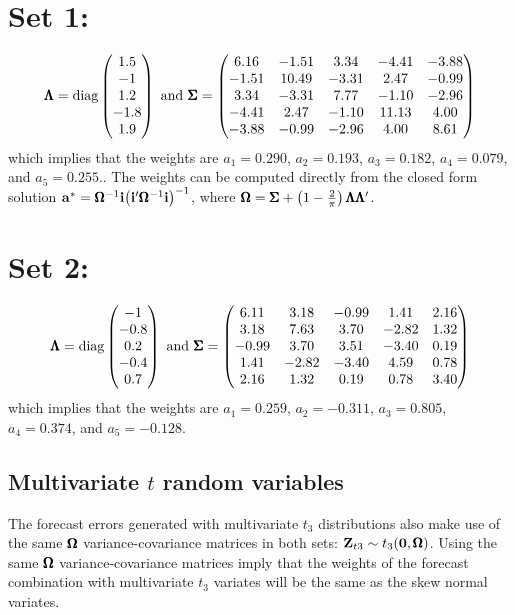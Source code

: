 \documentclass[a4paper, 11pt]{article}
\begin{document}
\section*{Set 1:} 
\[
\pmb{\Lambda}= \text{diag} \begin{pmatrix}
1.5 \\ 
-1\\ 
1.2\\ 
-1.8\\ 
1.9 
\end{pmatrix} 
\textrm{ and }  \pmb{\Sigma}=  
\begin{pmatrix}
6.16&	-1.51	& 3.34&	-4.41	&-3.88\\
-1.51&	10.49&	-3.31&	2.47&	-0.99\\
3.34&	-3.31	&7.77&	-1.10	&-2.96\\
-4.41&	2.47&	-1.10&	11.13&	4.00\\
-3.88	&-0.99&	-2.96	&4.00&	8.61
\end{pmatrix} 
\]
which implies that the weights are $a_1 = 0.290$, $a_2 = 0.193$, $a_3 = 0.182$, $a_4 = 0.079$, and $a_5 = 0.255$.. The weights can be computed directly from the closed form solution $\mathbf{a}^* = \pmb{\Omega}^{-1} \mathbf{i} {\left ( \mathbf{i}'\pmb{\Omega}^{-1}\mathbf{i} \right )}^{-1}$, where $ \pmb{\Omega} = \pmb{\Sigma} + \left ( 1 - \frac{2}{\pi} \right ) \pmb{\Lambda} \pmb{\Lambda}'$.

\section*{Set 2:} 
\[
\pmb{\Lambda}= \text{diag} \begin{pmatrix}
-1\\
-0.8\\
0.2\\
-0.4\\
0.7
\end{pmatrix} 
\textrm{ and }  \pmb{\Sigma}=  
\begin{pmatrix}
6.11&	3.18&	-0.99	&1.41&	2.16\\
3.18&	7.63&	3.70&	-2.82&	1.32\\
-0.99	&3.70&	3.51&	-3.40	&0.19\\
1.41&	-2.82&	-3.40	&4.59&	0.78\\
2.16&	1.32&	0.19&	0.78&	3.40
\end{pmatrix} 
\]
which implies that the weights are $a_1 = 0.259$, $a_2 = -0.311$, $a_3 = 0.805$, $a_4 = 0.374$, and $a_5 = -0.128$.

\subsection{Multivariate $t$ random variables}
The forecast errors generated with multivariate $t_3$ distributions also make use of the same $\pmb{\Omega}$ variance-covariance matrices in both sets: $\mathbf{Z}_{t3} \sim t_3 (\mathbf{0}, \pmb{\Omega})$. Using the same  $\pmb{\Omega}$ variance-covariance matrices imply that the weights of the forecast combination with multivariate $t_3$ variates will be the same as the skew normal variates.
\end{document}
